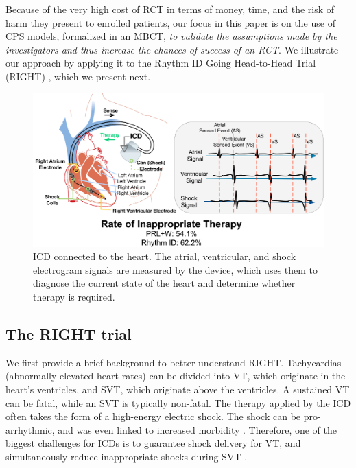 Because of the very high cost of RCT in terms of money, time, and the risk of harm they present to enrolled patients, our focus in this paper is on the use of CPS models, formalized in an MBCT, \emph{to validate the assumptions made by the investigators and thus increase the chances of success of an RCT}.
We illustrate our approach by applying it to the Rhythm ID Going Head-to-Head Trial (RIGHT) \cite{GoldABBTB11_RIGHTresults}, which we present next.
\begin{figure}[tb]
	\includegraphics[scale=0.6]{figures/figICD.pdf}
	\caption{ICD connected to the heart. The atrial, ventricular, and shock electrogram signals are measured by the device, which uses them to diagnose the current state of the heart and determine whether therapy is required.}
	\label{fig:icd}
\end{figure}

\subsection{The RIGHT trial}
\label{sec:right}
We first provide a brief background to better understand RIGHT. Tachycardias (abnormally elevated heart rates) can be divided into VT, which originate in the heart's ventricles, 
and SVT, which originate above the ventricles.
A sustained VT can be fatal, while an SVT is typically non-fatal.
The therapy applied by the ICD often takes the form of a high-energy electric shock.
The shock can be pro-arrhythmic, and was even linked to increased morbidity \cite{shock_mortality}.
Therefore, one of the biggest challenges for ICDs is to guarantee shock delivery for VT, and simultaneously reduce inappropriate shocks during SVT \cite{Ellenbogen11_Pacingbook}.

